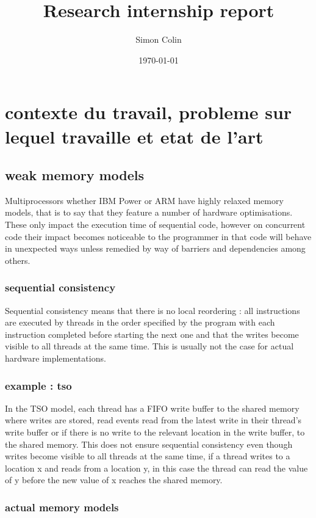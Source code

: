 \documentclass[a4]{article}
\title{Research internship report}
\author{Simon Colin}
\date{\today}
\begin{document}
\maketitle

\section{contexte du travail, probleme sur lequel travaille et etat de l'art}

\subsection{weak memory models}

Multiprocessors whether IBM Power or ARM have highly relaxed memory models, that is to say that they feature a number of hardware optimisations. These only impact the execution time of sequential code, however on concurrent code their impact becomes noticeable to the programmer in that code will behave in unexpected ways unless remedied by way of barriers and dependencies among others.

\subsubsection{sequential consistency}

Sequential consistency means that there is no local reordering : all instructions are executed by threads in the order specified by the program with each instruction completed before starting the next one and that the writes become visible to all threads at the same time. This is usually not the case for actual hardware implementations.

\subsubsection{example : tso}

In the TSO model, each thread has a FIFO write buffer to the shared memory where writes are stored, read events read from the latest write in their thread's write buffer or if there is no write to the relevant location in the write buffer, to the shared memory. This does not ensure sequential consistency even though writes become visible to all threads at the same time, if a thread writes to a location x and reads from a location y, in this case the thread can read the value of y before the new value of x reaches the shared memory.

\subsubsection{actual memory models}
\end{document}

